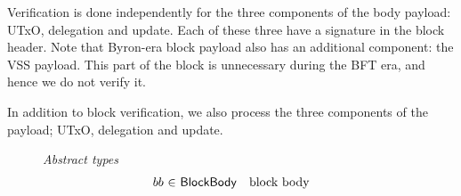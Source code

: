 \documentclass[11pt,a4paper]{article}
\begin{document}
Verification is done independently for the three components of the body payload:
UTxO, delegation and update. Each of these three have a signature in the block
header. Note that Byron-era block payload also has an additional component: the
VSS payload. This part of the block is unnecessary during the BFT era, and hence
we do not verify it.

In addition to block verification, we also process the three components of the
payload; UTxO, delegation and update.

\begin{figure}[ht]
  \emph{Abstract types}
  \begin{equation*}
    \begin{array}{r@{~\in~}lr}
      bb & \Bbody & \text{block body} \\


\end{array}
\end{equation*}
\end{figure}
\end{document}
